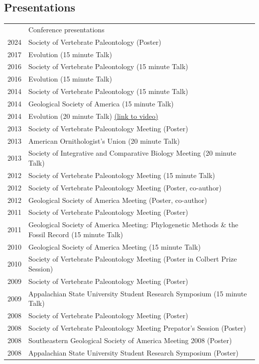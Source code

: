 \documentclass[a4paper, oneside, final]{scrartcl} %
\newcommand{\gray}{\rowcolor[gray]{.90}} %
\begin{document}
\begin{center}
\section{Presentations}
\begin{tabularx}{0.97\linewidth}{>{\raggedleft\scshape}p{2cm}X}
 & Conference presentations \\
 2024 & Society of Vertebrate Paleontology (Poster) \\
\gray 2017 & Evolution (15 minute Talk) \\
 2016 & Society of Vertebrate Paleontology (15 minute Talk) \\
\gray 2016 & Evolution (15 minute Talk) \\
  2014 & Society of Vertebrate Paleontology (15 minute Talk) \\
\gray 2014 & Geological Society of America (15 minute Talk) \\
 2014 & Evolution (20 minute Talk) \href{https://www.youtube.com/watch?v=geyHNOFDg60}{(link to video)} \\ 
\gray 2013 & Society of Vertebrate Paleontology Meeting (Poster) \\
 2013 & American Ornithologist's Union (20 minute Talk) \\
\gray 2013 & Society of Integrative and Comparative Biology Meeting (20 minute Talk) \\
 2012 & Society of Vertebrate Paleontology Meeting (15 minute Talk) \\
\gray 2012 & Society of Vertebrate Paleontology Meeting (Poster, co-author) \\
 2012 & Geological Society of America Meeting (Poster, co-author) \\
\gray 2011 & Society of Vertebrate Paleontology Meeting (Poster) \\
 2011 & Geological Society of America Meeting: Phylogenetic Methods \& the Fossil Record (15 minute Talk) \\
\gray 2010 & Geological Society of America Meeting (15 minute Talk) \\
 2010 & Society of Vertebrate Paleontology Meeting (Poster in Colbert Prize Session) \\
\gray 2009 & Society of Vertebrate Paleontology Meeting (Poster) \\
 2009 & Appalachian State University Student Research Symposium (15 minute Talk) \\
\gray 2008 & Society of Vertebrate Paleontology Meeting (Poster) \\
 2008 & Society of Vertebrate Paleontology Meeting Prepator's Session (Poster) \\
\gray 2008 & Southeastern Geological Society of America Meeting 2008 (Poster) \\
 2008 & Appalachian State University Student Research Symposium (Poster) \\
\end{tabularx}


\end{center}
\end{document}
